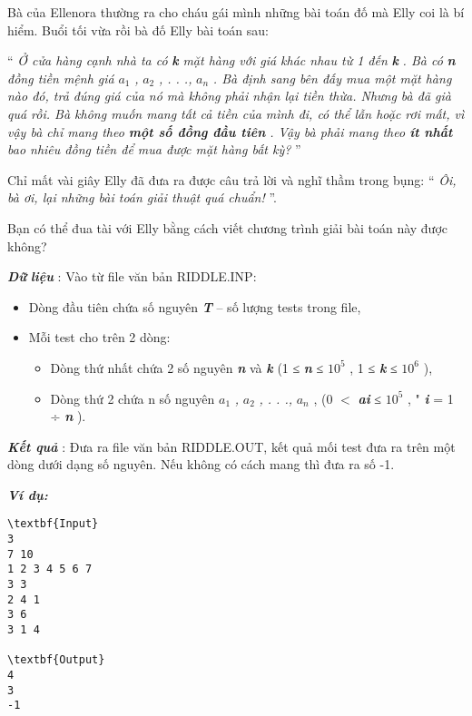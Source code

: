 

Bà của Ellenora thường ra cho cháu gái mình những bài toán đố mà Elly coi là bí hiểm. Buổi tối vừa rồi bà đố Elly bài toán sau:

“ \emph{ Ở cửa hàng cạnh nhà ta có }\textbf{\emph{ k }}\emph{ mặt hàng với giá khác nhau từ 1 đến }\textbf{\emph{ k }}\emph{ . Bà có }\textbf{\emph{ n }}\emph{ đồng tiền mệnh giá }\textbf{\emph{ $a_{1}$}}\emph{ , }\textbf{\emph{ $a_{2}$}}\emph{ , . . ., }\textbf{\emph{ $a_{n}$}}\emph{ . Bà định sang bên đấy mua một mặt hàng nào đó, trả đúng giá của nó mà không phải nhận lại tiền thừa. Nhưng bà đã già quá rồi. Bà không muốn mang tất cả tiền của mình đi, có thể lẫn hoặc rơi mất, vì vậy bà chỉ mang theo \textbf{ một số đồng đầu tiên } . Vậy bà phải mang theo \textbf{ ít nhất } bao nhiêu đồng tiền để mua được mặt hàng bất kỳ? } ”

Chỉ mất vài giây Elly đã đưa ra được câu trả lời và nghĩ thầm trong bụng: “ \emph{ Ôi, bà ơi, lại những bài toán giải thuật quá chuẩn! } ”.

Bạn có thể đua tài với Elly bằng cách viết chương trình giải bài toán này được không?

\textbf{\emph{Dữ }}\textbf{\emph{ liệu }} : Vào từ file văn bản RIDDLE.INP:
\begin{itemize}
	\item Dòng đầu tiên chứa số nguyên \textbf{\emph{ T }} – số lượng tests trong file,
	\item Mỗi test cho trên 2 dòng:
\begin{itemize}
	\item Dòng thứ nhất chứa 2 số nguyên \textbf{\emph{ n }} và \textbf{\emph{ k }} (1 ≤ \textbf{\emph{ n }} ≤ $10^{5}$ , 1 ≤ \textbf{\emph{ k }} ≤ $10^{6}$ ),
	\item Dòng thứ 2 chứa n số nguyên \textbf{\emph{ $a_{1}$}}\emph{ , }\textbf{\emph{ $a_{2}$}}\emph{ , . . ., }\textbf{\emph{ $a_{n}$}} , (0 $<$ \textbf{\emph{ ai }} ≤ $10^{5}$ , " \textbf{\emph{ i }} = 1 ÷ \textbf{\emph{ n }} ).
\end{itemize}
\end{itemize}

\textbf{\emph{Kết quả }} : Đưa ra file văn bản RIDDLE.OUT, kết quả mối test đưa ra trên một dòng dưới dạng số nguyên. Nếu không có cách mang thì đưa ra số -1.

\textbf{\emph{Ví dụ: }}
\begin{verbatim}
\textbf{Input}
3
7 10
1 2 3 4 5 6 7
3 3
2 4 1
3 6
3 1 4

\textbf{Output}
4
3
-1\end{verbatim}
